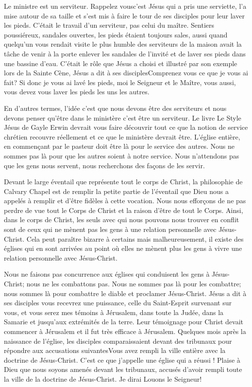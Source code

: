 Le ministre est un serviteur. Rappelez vous\frcolon c’est Jésus qui a pris une serviette, l'a mise autour de sa taille et s’est mis
à faire le tour de ses disciples pour leur laver les pieds. C’était le travail d’un serviteur, pas celui du maître. Sentiers
poussiéreux, sandales ouvertes, les pieds étaient toujours sales, aussi quand quelqu’un vous rendait visite le plus
humble des serviteurs de la maison avait la tâche de venir à la porte enlever les sandales de l’invité et de laver ses
pieds dans une bassine d’eau. C’était le rôle que Jésus a choisi et illustré par son exemple lors de la Sainte Cène,
Jésus a dit à ses disciples\frcolon\og Comprenez vous ce que je vous ai fait? Si donc je vous ai lavé les pieds, moi le Seigneur
et le Maître, vous aussi, vous devez vous laver les pieds les uns les autres.\fg{}

En d’autres termes, l’idée c'est que nous devons être des serviteurs et nous devons penser qu'être dans le ministère
c'est être un serviteur. Le livre \og Le Style Jésus\fg{} de Gayle Erwin devrait vous faire découvrir tout ce que la notion de
service chrétien recouvre réellement et ce que le ministère devrait être. L’église entière, en commençant par le
pasteur doit être là pour le service des autres. Nous ne sommes pas là pour que les autres soient à notre service.
Nous n’attendons pas que les gens nous servent, nous recherchons des façons de les servir.

Devant le large éventail que représente tout le corps de Christ, la philosophie de Calvary Chapel est de remplir la
petite partie de l’éventail que Dieu nous a appelés à remplir et d’être fidèles à cette vocation. Nous nous efforçons de
ne pas perdre de vue tout le Corps de Christ et la raison d'être de tout le Corps. Ainsi, dans le corps de Christ, les
seuls avec qui nous pouvons nous trouver en conflit sont de ceux qui ne mènent pas les gens à une relation
personnelle avec Jésus-Christ. Cela peut paraître bizarre à certains mais malheureusement, il existe des églises qui en
sont arrivées au point où elles ne mènent plus les gens à vivre une relation personnelle avec Jésus-Christ.

Nous ne faisons pas concurrence aux églises qui conduisent les gens à Jésus-Christ; nous ne les combattons pas.
Nous ne sommes pas là pour les combattre; nous sommes là pour combattre le diable et proclamer Jésus-Christ.
Jésus a dit à ses disciples \og vous recevrez une puissance, celle du Saint-Esprit survenant sur vous, et vous serez mes
témoins à Jérusalem, dans toute la Judée, dans la Samarie et jusqu’aux extrémités de la terre.\fg{} Leur témoignage pour
Christ devait commencer à Jérusalem et il fut très efficace à Jérusalem. Quelques mois après la naissance de l’église,
les disciples comparaissaient devant des tribunaux pour répondre aux accusations suivantes\frcolon\og Vous avez rempli la
ville entière avec la doctrine de Jésus-Christ.\fg{} C’est ce que j’appelle une église qui a réussi ! Plaise à Dieu que nous
soyons amenés devant les tribunaux, accusés d’avoir rempli toute la ville de la doctrine de Jésus-Christ. Je dirai\frcolon
\og Louons le Seigneur! \fg{}


